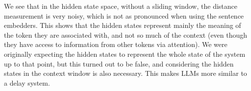 \documentclass[a4paper,12pt]{article}
\begin{document}
We see that in the hidden state space, without a sliding window, the distance measurement is very noisy, which is not as pronounced when using the sentence embedders. This shows that the hidden states represent mainly the meaning of the token they are associated with, and not so much of the context (even though they have access to information from other tokens via attention). 
We were originally expecting the hidden states to represent the whole state of the system up to that point, but this turned out to be false, and considering the hidden states in the context window is also necessary. This makes LLMs more similar to a delay system. %
\end{document}

